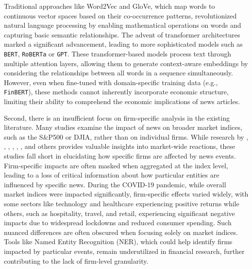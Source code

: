 Traditional approaches like Word2Vec and GloVe, which map words to continuous vector spaces based on their co-occurrence patterns, revolutionized natural language processing by enabling mathematical operations on words and capturing basic semantic relationships. The advent of transformer architectures marked a significant advancement, leading to more sophisticated models such as \texttt{BERT}, \texttt{RoBERTa} or \texttt{GPT}. These transformer-based models process text through multiple attention layers, allowing them to generate context-aware embeddings by considering the relationships between all words in a sequence simultaneously. However, even when fine-tuned with domain-specific training data (e.g., \texttt{FinBERT}), these methods cannot inherently incorporate economic structure, limiting their ability to comprehend the economic implications of news articles.

Second, there is an insufficient focus on firm-specific analysis in the existing literature. Many studies examine the impact of news on broader market indices, such as the S\&P500 or DJIA, rather than on individual firms. While research by 
\cite{cutler1988moves}, \cite{mitchell1994impact}, \cite{bollen2011twitter}, \cite{garcia2013sentiment}, \cite{baker2016measuring}, \cite{manela2017news}, \cite{baker2021triggers} 
and others provides valuable insights into market-wide reactions, these studies fall short in elucidating how specific firms are affected by news events. Firm-specific impacts are often masked when aggregated at the index level, leading to a loss of critical information about how particular entities are influenced by specific news. 
During the COVID-19 pandemic, while overall market indices were impacted significantly, firm-specific effects varied widely, with some sectors like technology and healthcare experiencing positive returns while others, such as hospitality, travel, and retail, experiencing significant negative impacts due to widespread lockdowns and reduced consumer spending. 
Such nuanced differences are often obscured when focusing solely on market indices. Tools like Named Entity Recognition (NER), which could help identify firms impacted by particular events, remain underutilized in financial research, further contributing to the lack of firm-level granularity.

